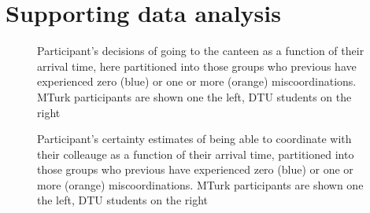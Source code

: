 \documentclass[a4paper,superscriptaddress,nofootinbib]{revtex4}
\begin{document}
\section*{Supporting data analysis}
\begin{figure} %
\hfill
{}\hfill
\caption{Participant's decisions of going to the canteen as a function of their arrival time, here partitioned into those groups who previous have experienced zero (blue) or one or more (orange) miscoordinations. MTurk participants are shown one the left, DTU students on the right}\label{fig:miscoordinations}
\caption{Participant's certainty estimates of being able to coordinate with their colleauge as a function of their arrival time, partitioned into those groups who previous have experienced zero (blue) or one or more (orange) miscoordinations. MTurk participants are shown one the left, DTU students on the right}\label{fig:certainties}
\end{figure}
\end{document}
